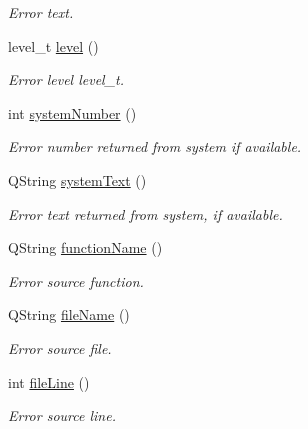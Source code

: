 \begin{DoxyCompactItemize}
\begin{DoxyCompactList}\small\item\em Error text. \end{DoxyCompactList}\item 
\hypertarget{classmdt_error_a4d7df33307a07dc1c51d2806d90ea13d}{
level\_\-t \hyperlink{classmdt_error_a4d7df33307a07dc1c51d2806d90ea13d}{level} ()}
\label{classmdt_error_a4d7df33307a07dc1c51d2806d90ea13d}

\begin{DoxyCompactList}\small\item\em Error level  level\_\-t. \end{DoxyCompactList}\item 
\hypertarget{classmdt_error_a0c5d7ff948d194c31720636b8a211c38}{
int \hyperlink{classmdt_error_a0c5d7ff948d194c31720636b8a211c38}{systemNumber} ()}
\label{classmdt_error_a0c5d7ff948d194c31720636b8a211c38}

\begin{DoxyCompactList}\small\item\em Error number returned from system if available. \end{DoxyCompactList}\item 
\hypertarget{classmdt_error_af03eb8afe4065160aec6480f56badd43}{
QString \hyperlink{classmdt_error_af03eb8afe4065160aec6480f56badd43}{systemText} ()}
\label{classmdt_error_af03eb8afe4065160aec6480f56badd43}

\begin{DoxyCompactList}\small\item\em Error text returned from system, if available. \end{DoxyCompactList}\item 
\hypertarget{classmdt_error_a4df1fdf17b1c9356dbf3033f6181f8f6}{
QString \hyperlink{classmdt_error_a4df1fdf17b1c9356dbf3033f6181f8f6}{functionName} ()}
\label{classmdt_error_a4df1fdf17b1c9356dbf3033f6181f8f6}

\begin{DoxyCompactList}\small\item\em Error source function. \end{DoxyCompactList}\item 
\hypertarget{classmdt_error_a61a942e42c1f5c3208501dfd20f8692a}{
QString \hyperlink{classmdt_error_a61a942e42c1f5c3208501dfd20f8692a}{fileName} ()}
\label{classmdt_error_a61a942e42c1f5c3208501dfd20f8692a}

\begin{DoxyCompactList}\small\item\em Error source file. \end{DoxyCompactList}\item 
\hypertarget{classmdt_error_af93bfb0b3a2e88755f8d0e61d51b0be6}{
int \hyperlink{classmdt_error_af93bfb0b3a2e88755f8d0e61d51b0be6}{fileLine} ()}
\label{classmdt_error_af93bfb0b3a2e88755f8d0e61d51b0be6}

\begin{DoxyCompactList}\small\item\em Error source line. \end{DoxyCompactList}\end{DoxyCompactItemize}


